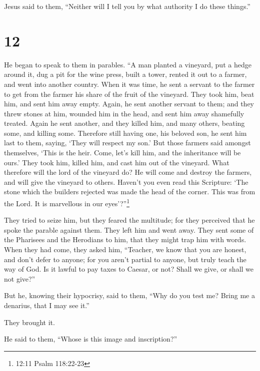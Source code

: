 Jesus said to them, ``Neither will I tell you by what authority I do
these things.''

\hypertarget{section-11}{%
\section{12}\label{section-11}}

 He began to speak to them in parables. ``A man planted a
vineyard, put a hedge around it, dug a pit for the wine press, built a
tower, rented it out to a farmer, and went into another country.
 When it was time, he sent a servant to the farmer to get
from the farmer his share of the fruit of the vineyard. 
They took him, beat him, and sent him away empty.  Again, he
sent another servant to them; and they threw stones at him, wounded him
in the head, and sent him away shamefully treated.  Again he
sent another, and they killed him, and many others, beating some, and
killing some.  Therefore still having one, his beloved son,
he sent him last to them, saying, `They will respect my son.'
 But those farmers said amongst themselves, `This is the
heir. Come, let's kill him, and the inheritance will be ours.'
 They took him, killed him, and cast him out of the
vineyard.  What therefore will the lord of the vineyard do?
He will come and destroy the farmers, and will give the vineyard to
others.  Haven't you even read this Scripture: `The stone
which the builders rejected was made the head of the corner.
 This was from the Lord. It is marvellous in our
eyes'?''\footnote{12:11 Psalm 118:22-23}

 They tried to seize him, but they feared the multitude;
for they perceived that he spoke the parable against them. They left him
and went away.  They sent some of the Pharisees and the
Herodians to him, that they might trap him with words. 
When they had come, they asked him, ``Teacher, we know that you are
honest, and don't defer to anyone; for you aren't partial to anyone, but
truly teach the way of God. Is it lawful to pay taxes to Caesar, or not?
 Shall we give, or shall we not give?''

But he, knowing their hypocrisy, said to them, ``Why do you test me?
Bring me a denarius, that I may see it.''

 They brought it.

He said to them, ``Whose is this image and inscription?''

